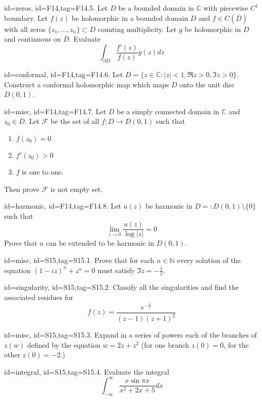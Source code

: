 \documentclass[12pt,letterpaper]{article}
\theoremstyle{plain}
\theoremstyle{definition}
\begin{document}
{\item[id=zeros, id=F14,tag=F14.5.]
Let $D$ be a bounded domain in $\mathbb{C}$ with piecewise $C^1$ boundary. Let $f(z)$ be holomorphic in a bounded domain $D$ and $f\in C(\overline{D})$ with all zeros $\{z_1,\ldots, z_n\} \subset D$ counting multiplicity. Let $g$ be holomorphic in $D$ and continuous on $\overline{D}$. Evaluate
\[
	\int_{\partial D} \frac{f'(z)}{f(z)} g(z) dz
\]
\item[id=conformal, id=F14,tag=F14.6.]
Let $D = \{z \in \mathbb{C} \colon | z | < 1, \Re z > 0, \Im z > 0\}$. Construct a conformal holomorphic map which maps $D$ onto the unit disc $D(0,1)$.

\item[id=misc, id=F14,tag=F14.7.]
Let $D$ be a simply connected domain in $\mathbb{C}$ and $z_0 \in D$. Let $\mathcal{F}$ be the set of all $f : D \rightarrow D(0,1)$ such that
\begin{enumerate}[label=(\roman*)]\onlyitems
\item $f(z_0) = 0$
\item $f'(z_0) > 0$
\item $f$ is one to one.
\end{enumerate}
Then prove $\mathcal{F}$ is not empty set.

\item[id=harmonic, id=F14,tag=F14.8.]
Let $u(z)$ be harmonic in $D =: D(0,1) \setminus \{0\}$ such that
\[
	\lim_{z\rightarrow 0} \frac{u(z)}{\log | z |} = 0
\]
Prove that $u$ can be extended to be harmonic in $D(0,1)$.


\item[id=misc, id=S15,tag=S15.1.]
Prove that for each $n \in \mathbb{N}$ every solution of the equation $(1-iz)^n + z^n = 0$ must satisfy $\Im z = -\frac{1}{2}.$
\item[id=singularity, id=S15,tag=S15.2.]
Classify all the singularities and find the associated residues for
\[
	f(z) = \frac{e^{-\frac{1}{z}}}{(z-1)(z+1)^2}
\]

\item[id=misc, id=S15,tag=S15.3.]
Expand in a series of powers each of the branches of $z(w)$ defined by the equation $w = 2z + z^2$ (for one branch $z(0) = 0$, for the other $z(0) = -2$.)

\item[id=integral, id=S15,tag=S15.4.]
Evaluate the integral
\[
	\int_{-\infty}^{\infty} \frac{x \sin \pi x}{x^2 + 2x + 5} dx
\]

}
\end{document}
